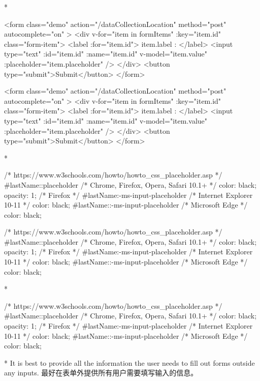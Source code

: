 \begin{paracol}{2} 
\switchcolumn[0]*%
\begin{codeHtml}
<form
  class="demo"
  action="/dataCollectionLocation"
  method="post"
  autocomplete="on"
>
  <div v-for="item in formItems" :key="item.id" class="form-item">
    <label :for="item.id">{{ item.label }}: </label>
    <input
      type="text"
      :id="item.id"
      :name="item.id"
      v-model="item.value"
      :placeholder="item.placeholder"
    />
  </div>
  <button type="submit">Submit</button>
</form>
\end{codeHtml}
\switchcolumn
\begin{codeHtml}
<form
  class="demo"
  action="/dataCollectionLocation"
  method="post"
  autocomplete="on"
>
  <div v-for="item in formItems" :key="item.id" class="form-item">
    <label :for="item.id">{{ item.label }}: </label>
    <input
      type="text"
      :id="item.id"
      :name="item.id"
      v-model="item.value"
      :placeholder="item.placeholder"
    />
  </div>
  <button type="submit">Submit</button>
</form>
\end{codeHtml}
\switchcolumn[0]*%
\begin{codeCss}
    /* https://www.w3schools.com/howto/howto_css_placeholder.asp */
    #lastName::placeholder {
      /* Chrome, Firefox, Opera, Safari 10.1+ */
      color: black;
      opacity: 1; /* Firefox */
    }
    #lastName:-ms-input-placeholder {
      /* Internet Explorer 10-11 */
      color: black;
    }
    #lastName::-ms-input-placeholder {
      /* Microsoft Edge */
      color: black;
    }
    \end{codeCss}
\switchcolumn
\begin{codeCss}
/* https://www.w3schools.com/howto/howto_css_placeholder.asp */
#lastName::placeholder {
  /* Chrome, Firefox, Opera, Safari 10.1+ */
  color: black;
  opacity: 1; /* Firefox */
}
#lastName:-ms-input-placeholder {
  /* Internet Explorer 10-11 */
  color: black;
}
#lastName::-ms-input-placeholder {
  /* Microsoft Edge */
  color: black;
}
\end{codeCss}
\switchcolumn[0]*%
\begin{codeHtml}
/* https://www.w3schools.com/howto/howto_css_placeholder.asp */
#lastName::placeholder {
  /* Chrome, Firefox, Opera, Safari 10.1+ */
  color: black;
  opacity: 1; /* Firefox */
}
#lastName:-ms-input-placeholder {
  /* Internet Explorer 10-11 */
  color: black;
}
#lastName::-ms-input-placeholder {
  /* Microsoft Edge */
  color: black;
}
\end{codeHtml}
\switchcolumn[0]*%
It is best to provide all the information the user needs to fill out
forms outside any inputs.
\switchcolumn
最好在表单外提供所有用户需要填写输入的信息。
\end{paracol}





